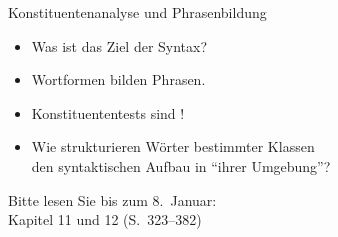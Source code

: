 \begin{frame}
  {Konstituentenanalyse und Phrasenbildung}
  \pause
  \begin{itemize}[<+->]
    \item Was ist das Ziel der Syntax?
    \item Wortformen bilden \alert{Phrasen}.
    \item Konstituententests sind !
    \item Wie strukturieren Wörter bestimmter Klassen\\
      den syntaktischen Aufbau in "`ihrer Umgebung"'?
  \end{itemize}
  \pause
  \Zeile
  \begin{center}
    Bitte lesen Sie bis zum 8.~Januar:\\
    \alert{Kapitel 11 und 12 (S.~323--382)}
  \end{center}
\end{frame}

